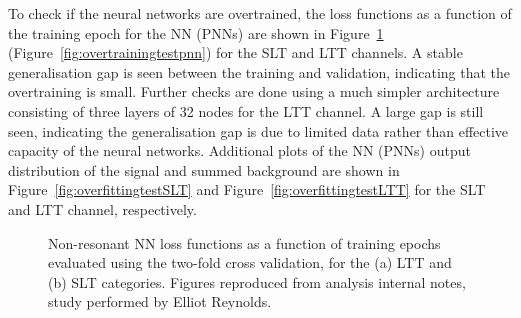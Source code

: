 To check if the neural networks are overtrained, 
the loss functions as a function of the training epoch for 
the NN (PNNs) are shown in Figure~\ref{fig:overtrainingtestnn} 
(Figure~\ref{fig:overtrainingtestpnn}) for the 
SLT and LTT channels. A stable generalisation gap is seen between 
the training and validation, indicating that the overtraining is small.
Further checks are done using a much simpler architecture consisting of three layers
of 32 nodes for the LTT channel. A large gap is still seen, indicating the
generalisation gap is due to limited data rather than effective capacity of
the neural networks.
Additional plots of the NN (PNNs) output distribution of the signal and summed background
are shown in Figure~\ref{fig:overfittingtestSLT} and Figure~\ref{fig:overfittingtestLTT}
for the SLT and LTT channel, respectively. 

\begin{figure}
  \centering
  \quad
  \quad
  \caption{Non-resonant NN loss functions as a function of training epochs evaluated 
  using the two-fold cross validation, for the (a) LTT and (b) SLT categories. 
  Figures reproduced from analysis internal notes, study performed by Elliot Reynolds.
  }
  \label{fig:overtrainingtestnn}
\end{figure}

